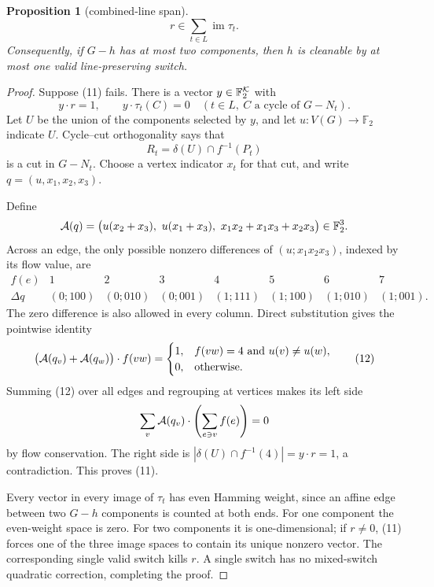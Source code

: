 \documentclass[11pt]{article}
\newtheorem{proposition}[theorem]{Proposition}
\theoremstyle{definition}
\theoremstyle{remark}
\newcommand{\F}{\mathbb F}
\begin{document}
\begin{proposition}[combined-line span]\label{prop:span}
\[
 r\in\sum_{t\in L}\operatorname{im}\tau_t.              \tag{11}
\]
Consequently, if \(G-h\) has at most two components, then \(h\) is
cleanable by at most one valid line-preserving switch.
\end{proposition}

\begin{proof}
Suppose (11) fails.  There is a vector
\(y\in\F_2^{\cal K}\) with
\[
 y\cdot r=1,\qquad y\cdot\tau_t(C)=0
 \quad(t\in L,\ C\text{ a cycle of }G-N_t).
\]
Let \(U\) be the union of the components selected by \(y\), and let
\(u:V(G)\to\F_2\) indicate \(U\).  Cycle--cut orthogonality says that
\[
 R_t=\delta(U)\cap f^{-1}(P_t)
\]
is a cut in \(G-N_t\).  Choose a vertex indicator \(x_t\) for that cut,
and write \(q=(u,x_1,x_2,x_3)\).

Define
\[
 {\cal A}(q)=
 \bigl(u(x_2+x_3),\ u(x_1+x_3),\
 x_1x_2+x_1x_3+x_2x_3\bigr)\in\F_2^3.
\]
Across an edge, the only possible nonzero differences of
\((u;x_1x_2x_3)\), indexed by its flow value, are
\[
\begin{array}{c|ccccccc}
f(e)&1&2&3&4&5&6&7\\
\hline
\Delta q&(0;100)&(0;010)&(0;001)&(1;111)&
(1;100)&(1;010)&(1;001).
\end{array}
\]
The zero difference is also allowed in every column.  Direct substitution
gives the pointwise identity
\[
 \bigl({\cal A}(q_v)+{\cal A}(q_w)\bigr)\cdot f(vw)
 =
 \begin{cases}
 1,&f(vw)=4\text{ and }u(v)\ne u(w),\\
 0,&\text{otherwise}.
 \end{cases}                                           \tag{12}
\]
Summing (12) over all edges and regrouping at vertices makes its left side
\[
 \sum_v{\cal A}(q_v)\cdot\left(\sum_{e\ni v}f(e)\right)=0
\]
by flow conservation.  The right side is
\(|\delta(U)\cap f^{-1}(4)|=y\cdot r=1\), a contradiction.  This proves
(11).

Every vector in every image of \(\tau_t\) has even Hamming weight, since
an affine edge between two \(G-h\) components is counted at both ends.
For one component the even-weight space is zero.  For two components it
is one-dimensional; if \(r\ne0\), (11) forces one of the three image
spaces to contain its unique nonzero vector.  The corresponding single
valid switch kills \(r\).  A single switch has no mixed-switch quadratic
correction, completing the proof.
\end{proof}
\end{document}
